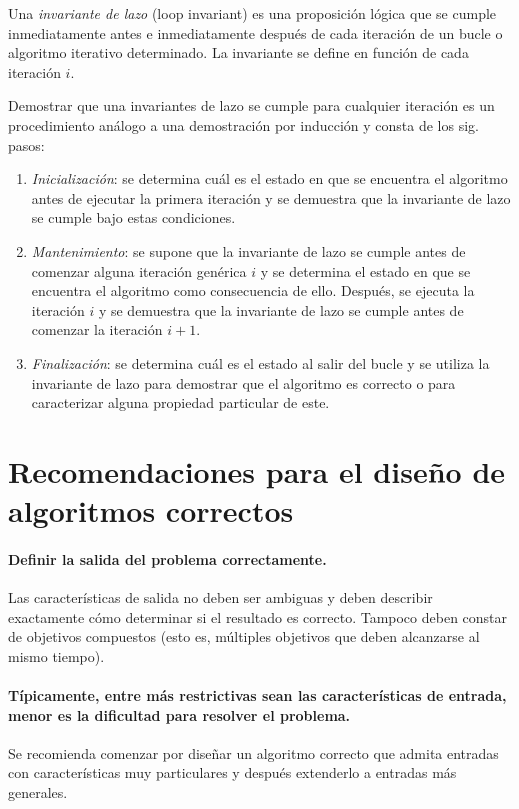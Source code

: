 Una \emph{invariante de lazo} (loop invariant) es una proposición lógica que se cumple inmediatamente antes e inmediatamente después de cada iteración de un bucle o algoritmo iterativo determinado. 
La invariante se define en función de cada iteración \(i\).

Demostrar que una invariantes de lazo se cumple para cualquier iteración es un procedimiento análogo a una demostración por inducción y consta de los sig. pasos: 
\begin{enumerate}
  \item \emph{Inicialización}: se determina cuál es el estado en que se encuentra el algoritmo antes de ejecutar la primera iteración y se demuestra que la invariante de lazo se cumple bajo estas condiciones.
  \item \emph{Mantenimiento}: se supone que la invariante de lazo se cumple antes de comenzar alguna iteración genérica \(i\) y se determina el estado en que se encuentra el algoritmo como consecuencia de ello. 
  Después, se ejecuta la iteración \(i\) y se demuestra que la invariante de lazo se cumple antes de comenzar la iteración \(i+1\).
  \item \emph{Finalización}: se determina cuál es el estado al salir del bucle y se utiliza la invariante de lazo para demostrar que el algoritmo es correcto o para caracterizar alguna propiedad particular de este. 
\end{enumerate}

\section{Recomendaciones para el diseño de algoritmos correctos}

\paragraph*{Definir la salida del problema correctamente.}{
  Las características de salida no deben ser ambiguas y deben describir exactamente cómo determinar si el resultado es correcto.
  Tampoco deben constar de objetivos compuestos (esto es, múltiples objetivos que deben alcanzarse al mismo tiempo).
}

\paragraph*{Típicamente, entre más restrictivas sean las características de entrada, menor es la dificultad para resolver el problema.}{
  Se recomienda comenzar por diseñar un algoritmo correcto que admita entradas con características muy particulares y después extenderlo a entradas más generales. 
}

